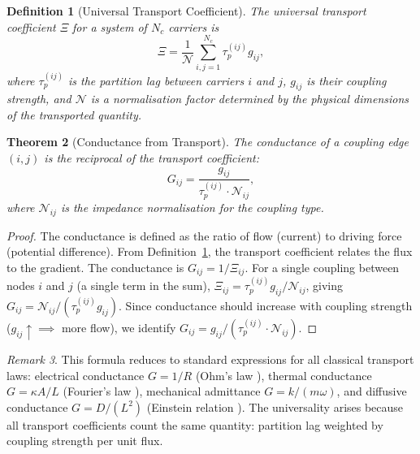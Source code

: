 \documentclass[twocolumn,10pt]{article}
\newtheorem{theorem}{Theorem}[section]
\newtheorem{definition}[theorem]{Definition}
\theoremstyle{remark}
\newtheorem{remark}[theorem]{Remark}
\newcommand{\defref}[1]{Definition~\ref{#1}}
\begin{document}
\begin{definition}[Universal Transport Coefficient]
\label{def:transport_coeff}
The \emph{universal transport coefficient} $\Xi$ for a system of $N_c$ carriers is
\begin{equation}
    \Xi = \frac{1}{\mathcal{N}} \sum_{i,j=1}^{N_c} \tau_p^{(ij)} g_{ij},
    \label{eq:transport_coeff}
\end{equation}
where $\tau_p^{(ij)}$ is the partition lag between carriers $i$ and $j$, $g_{ij}$ is their coupling strength, and $\mathcal{N}$ is a normalisation factor determined by the physical dimensions of the transported quantity.
\end{definition}

\begin{theorem}[Conductance from Transport]
\label{thm:conductance}
The \emph{conductance} of a coupling edge $(i,j)$ is the reciprocal of the transport coefficient:
\begin{equation}
    G_{ij} = \frac{g_{ij}}{\tau_p^{(ij)} \cdot \mathcal{N}_{ij}},
    \label{eq:conductance}
\end{equation}
where $\mathcal{N}_{ij}$ is the impedance normalisation for the coupling type.
\end{theorem}

\begin{proof}
The conductance is defined as the ratio of flow (current) to driving force (potential difference).  From \defref{def:transport_coeff}, the transport coefficient relates the flux to the gradient.  The conductance is $G_{ij} = 1/\Xi_{ij}$.  For a single coupling between nodes $i$ and $j$ (a single term in the sum), $\Xi_{ij} = \tau_p^{(ij)} g_{ij} / \mathcal{N}_{ij}$, giving $G_{ij} = \mathcal{N}_{ij} / (\tau_p^{(ij)} g_{ij})$.  Since conductance should increase with coupling strength ($g_{ij} \uparrow \implies$ more flow), we identify $G_{ij} = g_{ij}/(\tau_p^{(ij)} \cdot \mathcal{N}_{ij})$.
\end{proof}

\begin{remark}
This formula reduces to standard expressions for all classical transport laws: electrical conductance $G = 1/R$ (Ohm's law \cite{ohm1827}), thermal conductance $G = \kappa A/L$ (Fourier's law \cite{fourier1822}), mechanical admittance $G = k/(m\omega)$, and diffusive conductance $G = D/(L^2)$ (Einstein relation \cite{einstein1905}).  The universality arises because all transport coefficients count the same quantity: partition lag weighted by coupling strength per unit flux.
\end{remark}
\end{document}

